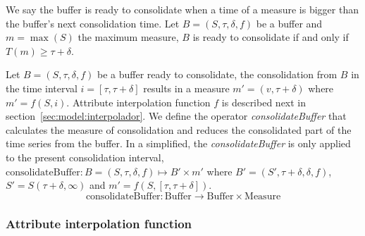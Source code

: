 We say the buffer is ready to consolidate when a time of a measure is
bigger than the buffer's next consolidation time.  Let
$B=(S,\tau,\delta,f)$ be a buffer and $m=\max(S)$ the maximum measure,
$B$ is ready to consolidate if and only if $T(m) \geq \tau+\delta$.



Let $B=(S,\tau,\delta,f)$ be a buffer ready to consolidate, the
consolidation from $B$ in the time interval $i=[\tau,\tau+\delta]$
results in a measure $m'=(v,\tau+\delta)$ where $m'=f(S,i)$. Attribute
interpolation function $f$ is described next in
section~\ref{sec:model:interpolador}.  We define the operator
\emph{consolidateBuffer} that calculates the measure of consolidation and
reduces the consolidated part of the time series from the buffer. In a
simplified, the \emph{consolidateBuffer} is only applied to the present
consolidation interval, $\text{consolidateBuffer}: B=(S,\tau,\delta,f)
\mapsto B' \times m' $ where $ B'= (S',\tau+\delta,\delta,f)$, $ S' =
S(\tau+\delta,\infty)$ and $m' = f(S,[\tau,\tau+\delta])$.
  \[
  \text{consolidateBuffer}: \text{Buffer} \longrightarrow \text{Buffer}
  \times \text{Measure}
  \]





\subsubsection{Attribute interpolation function}
\label{sec:model:interpolador}


